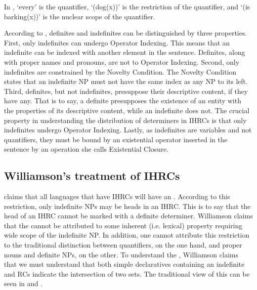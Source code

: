\documentclass[output=paper]{LSP/langsci}
\begin{document}
In , `every' is the quantifier, `(dog(x))' is the restriction of the quantifier, and `(is barking(x))' is the nuclear scope of the quantifier.  

According to \citet{Heim1982}, definites and indefinites can be distinguished by three properties. First, only indefinites can undergo Operator Indexing. This means that an indefinite can be indexed with another element in the sentence. Definites, along with proper names and pronouns, are not  to Operator Indexing. Second, only indefinites are constrained by the Novelty Condition. The Novelty Condition states that an indefinite NP must not have the same index as any NP to its left. Third, definites, but not indefinites, presuppose their descriptive content, if they have any.  That is to say, a definite presupposes the existence of an entity with the properties of its descriptive content, while an indefinite does not. The crucial property in understanding the distribution of determiners in IHRCs is that only indefinites undergo Operator Indexing. Lastly, as indefinites are variables and not quantifiers, they must be bound by an existential operator inserted in the sentence by an operation she calls Existential Closure.

\subsection{Williamson's treatment of IHRCs}\label{sec:boyle:6.2}

\citet{Williamson1987} claims that all languages that have IHRCs will have an . According to this restriction, only indefinite NPs may be heads in an IHRC. This is to say that the head of an IHRC cannot be marked with a definite determiner. Williamson claims that the  cannot be attributed to some inherent (i.e. lexical) property requiring wide scope of the indefinite NP. In addition, one cannot attribute this restriction to the traditional distinction between quantifiers, on the one hand, and proper nouns and definite NPs, on the other. To understand the , Williamson claims that we must understand that both simple declaratives containing an indefinite and RCs indicate the intersection of two sets. The traditional view of this can be seen in  and .
\end{document}
